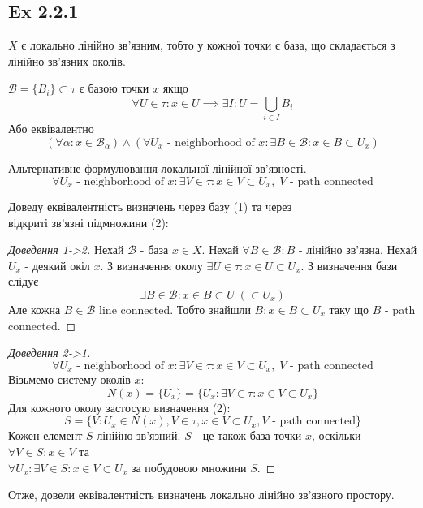 \documentclass[10pt, a4paper]{article} %
\renewcommand{\B}{\mathcal{B}}
\begin{document}
\subsection*{Ex 2.2.1}
\begin{mdframed}
    $X$ є локально лінійно зв'язним, тобто у кожної точки є база, що складається з лінійно зв'язних околів.
\end{mdframed}

\begin{mdframed}[backgroundcolor=blue!10]
    $\B = \{B_i\} \subset \tau$ є базою точки $x$ якщо 
    \[\forall U\in\tau: x\in U \implies \exists I: U = \bigcup_{i\in I} B_i \]
    Або еквівалентно
    \[(\forall \alpha: x \in \B_\alpha) \land (\forall U_x \text{ - neighborhood of }x: \exists B \in \B: x \in B \subset U_x)\]
\end{mdframed}

    Альтернативне формулювання локальної лінійної зв'язності.
    \[\forall U_x \text{ - neighborhood of }x: \exists V\in\tau: x \in V \subset U_x, \;V \text{ - path connected}\]

    Доведу еквівалентність визначень через базу (1) та через \\ 
    відкриті зв'язні підмножини (2):
    \begin{proof}[Доведення 1->2]
        Нехай $\B$ - база $x\in X$.
        Нехай $\forall B \in \B: B$ - лінійно зв'язна.
        Нехай $U_x$ - деякий окіл $x$.  
        З визначення околу $\exists U\in\tau: x \in U \subset U_x$.
        З визначення бази слідує
        \[\exists B \in \B: x \in B \subset U \;(\subset U_x)\]
        Але кожна $B\in\B$ line connected.
        Тобто знайшли $B: x\in B\subset U_x$ таку що $B$ - path connected.
    \end{proof}
    \begin{proof}[Доведення 2->1]
        \[\forall U_x \text{ - neighborhood of }x: \exists V\in\tau: x \in V \subset U_x, \;V \text{ - path connected}\]
        Візьмемо систему околів $x$:
        \[N(x) = \{U_x\} = \{U_x : \exists V\in \tau: x\in V \subset U_x\}\]
        Для кожного околу застосую визначення (2):
        \[S = \{V : U_x \in N(x), V \in \tau, x \in V \subset U_x, V \text{ - path connected}\}\]
        Кожен елемент $S$ лінійно зв'язний. $S$ - це також база точки $x$, оскільки
        $\forall V \in S: x \in V$ та \\
        $\forall U_x: \exists V \in S: x\in V \subset U_x$ за побудовою множини $S$.
    \end{proof}
Отже, довели еквівалентність визначень локально лінійно зв'язного простору.
\end{document}
